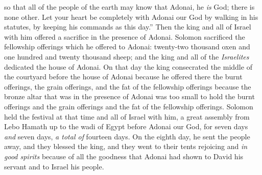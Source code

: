 \begin{biblechapter}
\verse so that all of the people of the earth may know that Adonai, he \textit{is} God; there is none other.
\verse Let your heart be completely with Adonai our God by walking in his statutes, by keeping his commands as this day.”
 Then the king and all of Israel with him offered a sacrifice in the presence of Adonai.
\verse Solomon sacrificed the fellowship offerings which he offered to Adonai: twenty-two thousand oxen and one hundred and twenty thousand sheep; and the king and all of the \textit{Israelites} dedicated the house of Adonai.
\verse On that day the king consecrated the middle of the courtyard before the house of Adonai because he offered there the burnt offerings, the grain offerings, and the fat of the fellowship offerings because the bronze altar that was in the presence of Adonai was too small to hold the burnt offerings and the grain offerings and the fat of the fellowship offerings.
\verse Solomon held the festival at that time and all of Israel with him, a great assembly from Lebo Hamath up to the wadi of Egypt before Adonai our God, for seven days \textit{and} seven days, \textit{a total of} fourteen days.
\verse On the eighth day, he sent the people away, and they blessed the king, and they went to their tents rejoicing and \textit{in good spirits} because of all the goodness that Adonai had shown to David his servant and to Israel his people.
\end{biblechapter}

